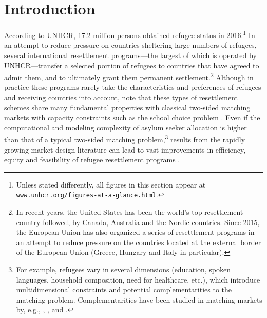 \documentclass[12pt,fleqn]{article}
\begin{document}

\section{Introduction}
According to UNHCR, 17.2 million persons obtained refugee status in 2016.\footnote{Unless stated differently, all figures in this section appear at \texttt{www.unhcr.org/figures-at-a-glance.html}.} In an attempt to reduce pressure on countries sheltering large numbers of refugees, several international resettlement programs---the largest of which is operated by UNHCR---transfer a selected portion of refugees to countries that have agreed to admit them, and to ultimately grant them permanent settlement.\footnote{In recent years, the United States has been the world's top resettlement country followed, by Canada, Australia and the Nordic countries. Since 2015, the European Union has also organized a series of resettlement programs in an attempt to reduce pressure on the countries located at the external border of the European Union (Greece, Hungary and Italy in particular).} Although in practice these programs rarely take the characteristics and preferences of refugees and receiving countries into account, \citet{bib:JonesTeytelboym2016b,bib:JonesTeytelboym2016a} note that these types of resettlement schemes share many fundamental properties with classical two-sided matching markets with capacity constraints such as the school choice problem \citep{bib:AbdulkadirougluSonmez}. Even if the computational and modeling complexity of asylum seeker allocation is higher than that of a typical two-sided matching problem,\footnote{For example, refugees vary in several dimensions (education, spoken languages, household composition, need for healthcare, etc.), which introduce multidimensional constraints and potential complementarities to the matching problem. Complementarities have been studied in matching markets by, e.g., \citet{bib:HatfieldKominers}, \citet{bib:PathakRoth}, \citet{bib:Pycia} and \citet{bib:RothPeranson}.} results from the rapidly growing market design literature can lead to vast improvements in efficiency, equity and feasibility of refugee resettlement programs \citep{bib:Andersson,bib:BansakEtAl,bib:DelacretazEtAl2016,bib:JonesTeytelboym2016b, bib:JonesTeytelboym2016a}.
\end{document}
